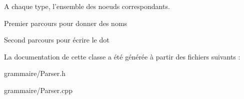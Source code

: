 A chaque type, l'ensemble des noeuds correspondants. 

Premier parcours pour donner des noms

Second parcours pour écrire le dot 

La documentation de cette classe a été générée à partir des fichiers suivants \-:\begin{DoxyCompactItemize}
\item 
grammaire/Parser.\-h\item 
grammaire/Parser.\-cpp\end{DoxyCompactItemize}
